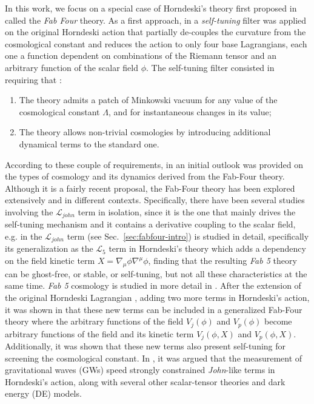 \documentclass[onecolumn,superscriptaddress,secnumarabic,amssymb,amsmath,nobibnotes,aps,prd,nofootinbib,altaffilletter]{revtex4}
\newcommand{\lag}{\mathcal{L}}
\begin{document}
In this work, we focus on a special case of Horndeski's theory first proposed in \cite{Charmousis_2012} called the \textit{Fab Four} theory. As a first approach, in \cite{Charmousis_2012} a \textit{self-tuning} filter was applied on the original Horndeski action that partially de-couples the curvature from the cosmological constant and reduces the action to only four base Lagrangians, each one a function dependent on combinations of the Riemann tensor and an arbitrary function of the scalar field $\phi$. The self-tuning filter consisted in requiring that \cite{Charmousis_2012}:
\begin{enumerate}
    \item The theory admits a patch of Minkowski vacuum for any value of the cosmological constant $\Lambda$, and for instantaneous changes in its value;
    \item The theory allows non-trivial cosmologies by introducing additional dynamical terms to the standard one.
\end{enumerate}
According to these couple of requirements, in \cite{Copeland:2012qf} an initial outlook was provided on the types of cosmology and its dynamics derived from the Fab-Four theory. Although it is a fairly recent proposal, the Fab-Four theory has been explored extensively and in different contexts. Specifically, there have been several studies involving the $\lag_{john}$ term in isolation, since it is the one that mainly drives the self-tuning mechanism \cite{Latosh:2018xai} and it contains a derivative coupling to the scalar field, e.g. in \cite{Linder:2013zoa} the $\lag_{john}$ term (see Sec.~\ref{sec:fabfour-intro}) is studied in detail, specifically its generalization as the $\lag_5$ term in Horndeski's theory which adds a dependency on the field kinetic term $X=\nabla_\mu \phi \nabla^\mu \phi$, finding that the resulting \textit{Fab 5} theory can be ghost-free, or stable, or self-tuning, but not all these characteristics at the same time. \textit{Fab 5} cosmology is studied in more detail in \cite{Starobinsky_2016, Starobinsky_2020, Galeev_2021}. After the extension of the original Horndeski Lagrangian \cite{Gleyzes_2015}, adding two more terms in Horndeski's action, it was shown in \cite{Babichev:2015qma} that these new terms can be included in a generalized Fab-Four theory where the arbitrary functions of the field $V_j(\phi)$ and $V_p(\phi)$ become arbitrary functions of the field and its kinetic term $V_j(\phi, X)$ and $V_p(\phi, X)$. Additionally, it was shown that these new terms also present self-tuning for screening the cosmological constant. In \cite{Ezquiaga_2017}, it was argued that the measurement of gravitational waves (GWs) speed strongly constrained \textit{John}-like terms in Horndeski's action, along with several other scalar-tensor theories and dark energy (DE) models. 
\end{document}
